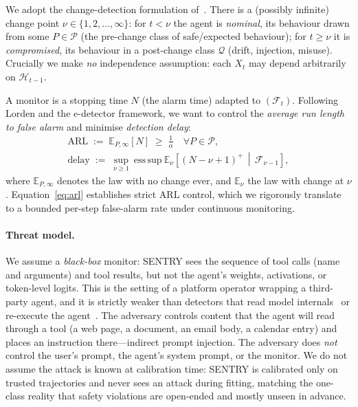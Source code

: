 \documentclass[pdflatex,sn-mathphys-num]{sn-jnl}%
\theoremstyle{thmstyleone}%
\theoremstyle{thmstyletwo}%
\theoremstyle{thmstylethree}%
\newcommand{\Ecal}{\mathbb{E}}
\newcommand{\Pcal}{\mathcal{P}}
\newcommand{\Qcal}{\mathcal{Q}}
\newcommand{\Fcal}{\mathcal{F}}
\newcommand{\Hcal}{\mathcal{H}}
\begin{document}
We adopt the change-detection formulation of~\cite{shin2023edetectors}. There
is a (possibly infinite) change point \(\nu\in\{1,2,\dots,\infty\}\): for
\(t<\nu\) the agent is \emph{nominal}, its behaviour drawn from some
\(P\in\Pcal\) (the pre-change class of safe/expected behaviour); for
\(t\ge\nu\) it is \emph{compromised}, its behaviour in a post-change class
\(\Qcal\) (drift, injection, misuse). Crucially we make \emph{no} independence
assumption: each \(X_t\) may depend arbitrarily on \(\Hcal_{t-1}\).

A monitor is a stopping time \(N\) (the alarm time) adapted to
\((\Fcal_t)\). Following Lorden and the e-detector framework, we want to
control the \emph{average run length to false alarm} and minimise
\emph{detection delay}:
\begin{align}
\text{ARL} \;:=\; \Ecal_{P,\infty}[N] \;\ge\; \tfrac{1}{\alpha}
   \quad \forall P\in\Pcal,
   \label{eq:arl}\\
\text{delay} \;:=\; \sup_{\nu\ge 1}\ \mathrm{ess\,sup}\
   \Ecal_{\nu}\!\left[(N-\nu+1)^{+}\,\middle|\,\Fcal_{\nu-1}\right],
   \label{eq:delay}
\end{align}
where \(\Ecal_{P,\infty}\) denotes the law with no change ever, and
\(\Ecal_\nu\) the law with change at \(\nu\). Equation~\eqref{eq:arl} establishes 
strict ARL control, which we rigorously translate to a bounded per-step false-alarm 
rate under continuous monitoring.

\paragraph{Threat model.} We assume a \emph{black-box} monitor: SENTRY sees
the sequence of tool calls (name and arguments) and tool results, but not the
agent's weights, activations, or token-level logits. This is the setting of a
platform operator wrapping a third-party agent, and it is strictly weaker than
detectors that read model internals~\cite{belenky2026cheap} or re-execute the
agent~\cite{zhu2025melon}. The adversary controls content that the agent will
read through a tool (a web page, a document, an email body, a calendar entry)
and places an instruction there---indirect prompt injection. The adversary
does \emph{not} control the user's prompt, the agent's system prompt, or the
monitor. We do not assume the attack is known at calibration time: SENTRY is
calibrated only on trusted trajectories and never sees an attack during
fitting, matching the one-class reality that safety violations are open-ended
and mostly unseen in advance.
\end{document}
